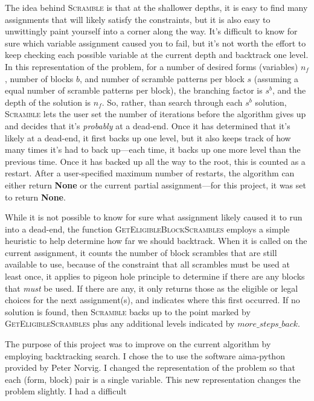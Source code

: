 \documentclass[11pt]{article}
\begin{document}
The idea behind \textsc{Scramble} is that at the shallower depths, it
is easy to find many assignments that will likely satisfy the
constraints, but it is also easy to unwittingly paint yourself into a
corner along the way.  It's difficult to know for sure which variable
assignment caused you to fail, but it's not worth the effort to keep
checking each possible variable at the current depth and backtrack one
level.  In this representation of the problem, for a number of desired
forms (variables) \(n_f\),
number of blocks \(b\),
and number of scramble patterns per block \(s\)
(assuming a equal number of scramble patterns per block), the
branching factor is \(s^b\),
and the depth of the solution is \(n_f\).
So, rather, than search through each \(s^b\)
solution, \textsc{Scramble} lets the user set the number of iterations
before the algorithm gives up and decides that it's \emph{probably} at
a dead-end.  Once it has determined that it's likely at a dead-end, it
first backs up one level, but it also keeps track of how many times
it's had to back up---each time, it backs up one more level than the
previous time.  Once it has backed up all the way to the root, this is
counted as a restart. After a user-specified maximum number of
restarts, the algorithm can either return \textbf{None} or the current
partial assignment---for this project, it was set to return
\textbf{None}.
\par
While it is not possible to know for sure what assignment likely
caused it to run into a dead-end, the function
\textsc{GetEligibleBlockScrambles} employs a simple heuristic to help
determine how far we should backtrack.  When it is called on the
current assignment, it counts the number of block scrambles that are
still available to use, because of the constraint that all scrambles
must be used at least once, it applies to pigeon hole principle to
determine if there are any blocks that \emph{must} be used.  If there
are any, it only returns those as the eligible or legal choices for
the next assignment(s), and indicates where this first occurred. If no
solution is found, then \textsc{Scramble} backs up to the point marked
by \textsc{GetEligibleScrambles} plus any additional levels indicated
by $\mathit{more\_steps\_back}$.
\par
The purpose of this project was to improve on the current algorithm by
employing backtracking search.  I chose the to use the software
aima-python provided by Peter Norvig.  I changed the representation of
the problem so that each (form, block) pair is a single variable. This
new representation changes the problem slightly. I had a difficult
\end{document}
